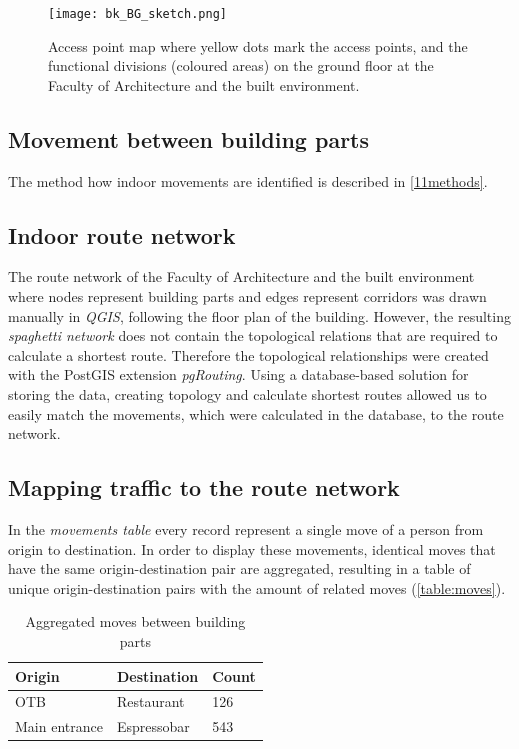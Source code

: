 \begin{figure}[H]
\centering
\texttt{[image: bk\_BG\_sketch.png]}
\captionsetup{justification=centering}
\caption{Access point map where yellow dots mark the access points, and the functional divisions (coloured areas) on the ground floor at the Faculty of Architecture and the built environment.}
\label{figure:BK_sketch}
\end{figure}

\subsection{Movement between building parts}
The method how indoor movements are identified is described in \autoref{11methods}.

\subsection{Indoor route network}
The route network of the Faculty of Architecture and the built environment where nodes represent building parts and edges represent corridors was drawn manually in \textit{QGIS}, following the floor plan of the building. However, the resulting \textit{spaghetti network} does not contain the topological relations that are required to calculate a shortest route. Therefore the topological relationships were created with the PostGIS extension \textit{pgRouting}. Using a database-based solution for storing the data, creating topology and calculate shortest routes allowed us to easily match the movements, which were calculated in the database, to the route network.

\subsection{Mapping traffic to the route network}
In the \textit{movements table} every record represent a single move of a person from origin to destination. In order to display these movements, identical moves that have the same origin-destination pair are aggregated, resulting in a table of unique origin-destination pairs with the amount of related moves
(\autoref{table:moves}).

\begin{table}[H]
\centering
\captionsetup{justification=centering}
\caption{Aggregated moves between building parts}
\label{table:moves}
\begin{tabular}{@{}lll@{}}
\toprule
Origin        & Destination & Count \\ \midrule
OTB           & Restaurant  & 126   \\
Main entrance & Espressobar & 543   \\ \bottomrule
\end{tabular}
\end{table}

